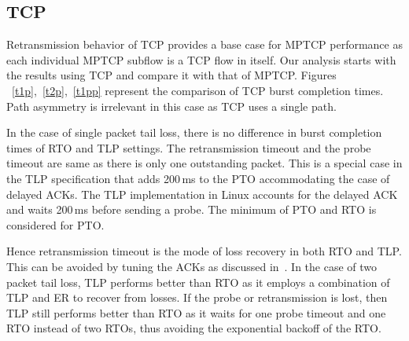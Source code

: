 \documentclass[10pt,conference,compsoc]{IEEEtran}
\begin{document}
\subsection{TCP}
Retransmission behavior of TCP provides a base case for MPTCP performance as each individual MPTCP subflow is a TCP flow in itself. Our analysis
starts with the results using TCP and compare it with that of MPTCP. Figures ~\ref{t1p},~\ref{t2p},~\ref{t1pp} represent the comparison of TCP 
burst completion times. Path asymmetry is irrelevant in this case as TCP uses a single path.

In the case of single packet tail loss, there is no difference in burst completion times of RTO and TLP settings. The retransmission
timeout and the probe timeout are same as there is only one outstanding packet. This is a special case in the TLP
specification that adds 200\,ms to the PTO accommodating the case of delayed ACKs. The TLP implementation in Linux accounts
for the delayed ACK and waits 200\,ms before sending a probe. The minimum of PTO and RTO is considered for PTO.

Hence retransmission timeout is the mode of loss recovery in both RTO and TLP. This can be avoided by tuning
the ACKs as discussed in~\cite{Rajiullah:2015}. In the case of two packet tail loss, TLP performs better than RTO as it employs a combination of TLP and ER to recover from losses. 
If the probe or retransmission is lost, then TLP still performs better than RTO as it waits for one probe timeout and one RTO instead of two RTOs, thus avoiding the exponential backoff of the RTO.
\end{document}
